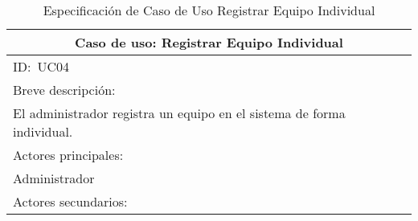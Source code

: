 \documentclass[stu, 12pt, letterpaper, donotrepeattitle, floatsintext, natbib]{apa7}
\begin{document}
\begin{longtable}{@{} p{16.5cm} @{}}
    \caption{Especificaci\'on de Caso de Uso Registrar Equipo Individual}\label{tab:UC04}                                                                                                                                                                                                      \\ \toprule
    \multicolumn{1}{c}{Caso de uso: Registrar Equipo Individual}                                                                                                                                                                                                                               \\ \midrule
    ID:~UC04                                                                                                                                                                                                                                                                                   \\ \midrule
    Breve descripci\'on:                                                                                                                                                                                                                                                                       \\
    El administrador registra un equipo en el sistema de forma individual.                                                                                                                                                                                                                     \\ \midrule
    Actores principales:                                                                                                                                                                                                                                                                       \\
    Administrador                                                                                                                                                                                                                                                                              \\ \midrule
    Actores secundarios:                                                                                                                                                                                                                                                                       \\

\end{longtable}
\end{document}
